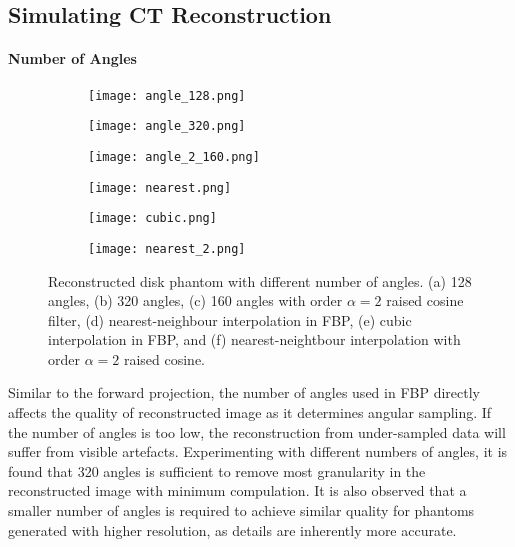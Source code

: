 \documentclass[10pt,twocolumn]{article}
\begin{document}
\subsection{Simulating CT Reconstruction}
\paragraph{Number of Angles}
\begin{figure}[htbp]
    \centering
    \begin{subfigure}[b]{0.3\linewidth}
        \texttt{[image: angle\_128.png]}
        \caption{}
    \end{subfigure}
    \begin{subfigure}[b]{0.3\linewidth}
        \texttt{[image: angle\_320.png]}
        \caption{}
    \end{subfigure}
    \begin{subfigure}[b]{0.3\linewidth}
        \texttt{[image: angle\_2\_160.png]}
        \caption{}
    \end{subfigure}
    \centering
    \begin{subfigure}[b]{0.3\linewidth}
        \texttt{[image: nearest.png]}
        \caption{}
    \end{subfigure}
    \begin{subfigure}[b]{0.3\linewidth}
        \texttt{[image: cubic.png]}
        \caption{}
    \end{subfigure}
    \begin{subfigure}[b]{0.3\linewidth}
        \texttt{[image: nearest\_2.png]}
        \caption{}
    \end{subfigure}
    \caption{Reconstructed disk phantom with different number of angles. (a) 128 angles, (b) 320 angles, (c) 160 angles with order $\alpha=2$ raised cosine filter, (d) nearest-neighbour interpolation in FBP, (e) cubic interpolation in FBP, and (f) nearest-neightbour interpolation with order $\alpha=2$ raised cosine.}
    \label{fig:angle}
\end{figure}

Similar to the forward projection, the number of angles used in FBP directly affects the quality of reconstructed image as it determines angular sampling. If the number of angles is too low, the reconstruction from under-sampled data will suffer from visible artefacts.
Experimenting with different numbers of angles, it is found that 320 angles is sufficient to remove most granularity in the reconstructed image with minimum compulation.
It is also observed that a smaller number of angles is required to achieve similar quality for phantoms generated with higher resolution, as details are inherently more accurate.
\end{document}
